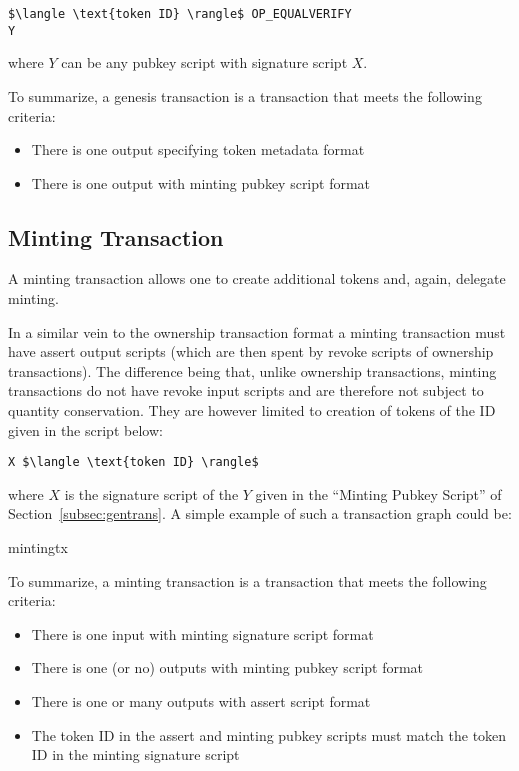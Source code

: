 \documentclass[9pt,oneside]{amsart}
\begin{document}
\begin{lstlisting}[title={\textbf{Minting PubKey Script}}]
$\langle \text{token ID} \rangle$ OP_EQUALVERIFY
Y
\end{lstlisting}
where $Y$ can be any pubkey script with signature script $X$. 

To summarize, a genesis transaction is a transaction that meets the following criteria:
\begin{itemize}
    \item There is one output specifying token metadata format
    \item There is one output with minting pubkey script format
\end{itemize}

\subsection{Minting Transaction}
A minting transaction allows one to create additional tokens and, again, delegate minting.

In a similar vein to the ownership transaction format a minting transaction must have assert output scripts (which are then spent by revoke scripts of ownership transactions). The difference being that, unlike ownership transactions, minting transactions do not have revoke input scripts and are therefore not subject to quantity conservation. They are however limited to creation of tokens of the ID given in the script below:

\begin{lstlisting}[title={\textbf{Minting Signature Script}}]
X $\langle \text{token ID} \rangle$
\end{lstlisting}
where $X$ is the signature script of the $Y$ given in the ``Minting Pubkey Script'' of Section~\ref{subsec:gentrans}. A simple example of such a transaction graph could be: 
\begin{center}
{mintingtx}
\end{center}

To summarize, a minting transaction is a transaction that meets the following criteria:
\begin{itemize}
    \item There is one input with minting signature script format
    \item There is one (or no) outputs with minting pubkey script format
    \item There is one or many outputs with assert script format
    \item The token ID in the assert and minting pubkey scripts must match the token ID in the minting signature script
\end{itemize}
\end{document}
